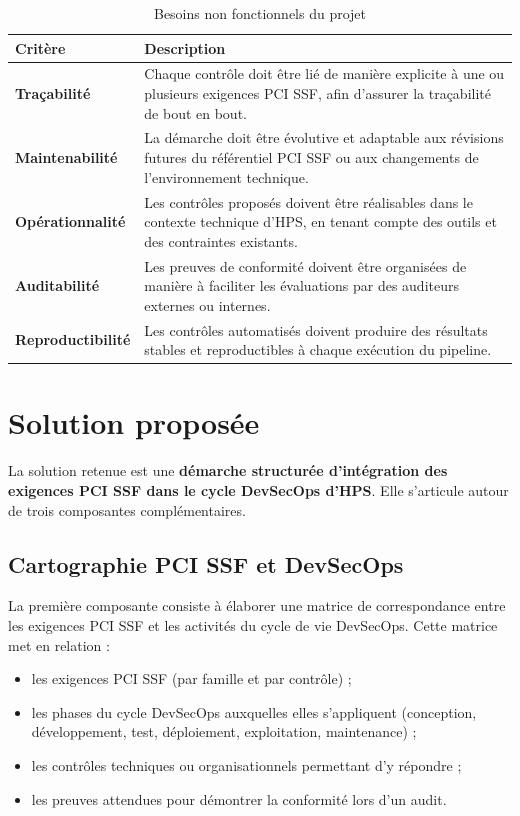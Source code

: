 \begin{table}[h!]
    \centering
    \caption{Besoins non fonctionnels du projet}
    \label{tab:besoins-nf}
    \begin{tabularx}{\textwidth}{>{\bfseries}p{3.5cm}X}
        \toprule
        Critère & Description \\
        \midrule
        Traçabilité & Chaque contrôle doit être lié de manière explicite à une ou plusieurs exigences PCI SSF, afin d'assurer la traçabilité de bout en bout. \\
        Maintenabilité & La démarche doit être évolutive et adaptable aux révisions futures du référentiel PCI SSF ou aux changements de l'environnement technique. \\
        Opérationnalité & Les contrôles proposés doivent être réalisables dans le contexte technique d'HPS, en tenant compte des outils et des contraintes existants. \\
        Auditabilité & Les preuves de conformité doivent être organisées de manière à faciliter les évaluations par des auditeurs externes ou internes. \\
        Reproductibilité & Les contrôles automatisés doivent produire des résultats stables et reproductibles à chaque exécution du pipeline. \\
        \bottomrule
    \end{tabularx}
\end{table}

\section{Solution proposée}

La solution retenue est une \textbf{démarche structurée d'intégration des exigences PCI SSF dans le cycle DevSecOps d'HPS}. Elle s'articule autour de trois composantes complémentaires.

\subsection{Cartographie PCI SSF et DevSecOps}

La première composante consiste à élaborer une matrice de correspondance entre les exigences PCI SSF et les activités du cycle de vie DevSecOps. Cette matrice met en relation :

\begin{itemize}
    \item les exigences PCI SSF (par famille et par contrôle) ;
    \item les phases du cycle DevSecOps auxquelles elles s'appliquent (conception, développement, test, déploiement, exploitation, maintenance) ;
    \item les contrôles techniques ou organisationnels permettant d'y répondre ;
    \item les preuves attendues pour démontrer la conformité lors d'un audit.
\end{itemize}

